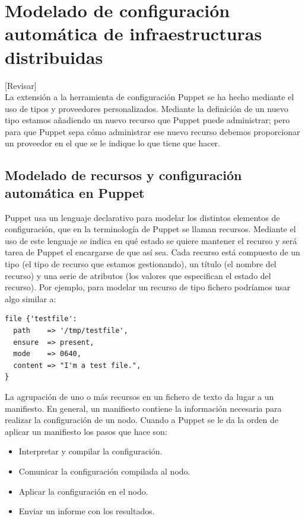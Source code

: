 \chapter{Modelado de configuración automática de infraestructuras distribuidas}
\label{cap:modelado}

[Revisar]\\

La extensión a la herramienta de configuración Puppet se ha hecho mediante el uso de tipos y proveedores personalizados. Mediante la definición de un nuevo tipo estamos añadiendo un nuevo recurso que Puppet puede administrar; pero para que Puppet sepa cómo administrar ese nuevo recurso debemos proporcionar un proveedor en el que se le indique lo que tiene que hacer.


\section{Modelado de recursos y configuración automática en Puppet}

Puppet usa un lenguaje declarativo para modelar los distintos elementos de configuración, que en la terminología de Puppet se llaman recursos. Mediante el uso de este lenguaje se indica en qué estado se quiere mantener el recurso y será tarea de Puppet el encargarse de que así sea. Cada recurso está compuesto de un tipo (el tipo de recurso que estamos gestionando), un título (el nombre del recurso) y una serie de atributos (los valores que especifican el estado del recurso). Por ejemplo, para modelar un recurso de tipo fichero podríamos usar algo similar a:

\begin{lstlisting}
file {'testfile':
  path    => '/tmp/testfile',
  ensure  => present,
  mode    => 0640,
  content => "I'm a test file.",
}
\end{lstlisting}

La agrupación de uno o más recursos en un fichero de texto da lugar a un manifiesto. En general, un manifiesto contiene la información necesaria para realizar la configuración de un nodo. Cuando a Puppet se le da la orden de aplicar un manifiesto los pasos que hace son:
\begin{itemize}
\item Interpretar y compilar la configuración.
\item Comunicar la configuración compilada al nodo.
\item Aplicar la configuración en el nodo.
\item Enviar un informe con los resultados.
\end{itemize}

